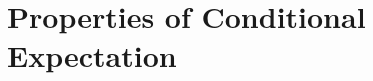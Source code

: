 \documentclass[letterpaper,10pt,english]{article}
\begin{document}
%
%
\section{Properties of Conditional Expectation}
\end{document}
